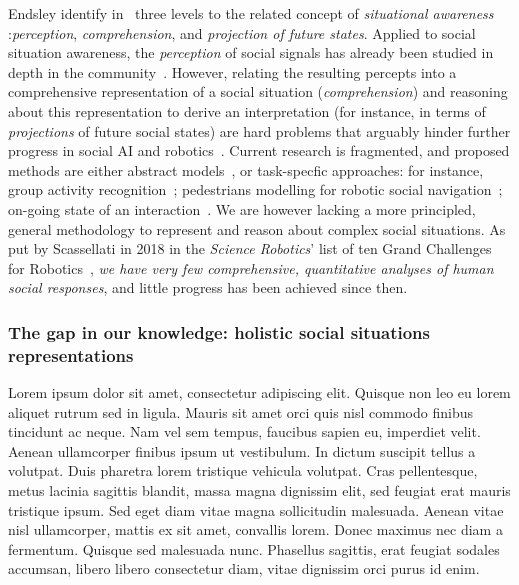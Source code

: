 Endsley identify in~\cite{endsley1995theory} three levels to the related concept
of \textit{situational awareness} :\emph{perception}, \emph{comprehension}, and
\emph{projection of future states}. Applied to social situation awareness,
the \emph{perception} of social signals has already been studied in depth in the
community~\cite{pantic2011social,vinciarelli2009social}.  However, relating the
resulting percepts into a comprehensive representation of a social situation
(\emph{comprehension}) and reasoning about this representation to derive an
interpretation (for instance, in terms of \emph{projections} of future social
states) are hard problems that arguably hinder further progress in social AI and
robotics~\cite{yang2018grand}. Current research is fragmented, and proposed
methods are either abstract models~\cite{gordon2016commonsense}, or task-specfic
approaches: for instance, group activity
recognition~\cite{shu2017cern,wu2019learning}; pedestrians modelling for robotic
social navigation~\cite{alahi2016social}; on-going state of an
interaction~\cite{garcía2020explainable}. We are however lacking a more
principled, general methodology to represent and reason about complex social
situations. As put by Scassellati in 2018 in the \emph{Science Robotics}' list of
ten Grand Challenges for Robotics~\cite{yang2018grand}, \emph{we have very few
comprehensive, quantitative analyses of human social responses}, and little
progress has been achieved since then.


\subsubsection{The gap in our knowledge: holistic social situations
representations}

\begin{rewrite}
Lorem ipsum dolor sit amet, consectetur adipiscing elit. Quisque non leo eu
lorem aliquet rutrum sed in ligula. Mauris sit amet orci quis nisl commodo
finibus tincidunt ac neque. Nam vel sem tempus, faucibus sapien eu,
imperdiet velit. Aenean ullamcorper finibus ipsum ut vestibulum. In dictum
suscipit tellus a volutpat. Duis pharetra lorem tristique vehicula volutpat.
Cras pellentesque, metus lacinia sagittis blandit, massa magna dignissim
elit, sed feugiat erat mauris tristique ipsum. Sed eget diam vitae magna
sollicitudin malesuada. Aenean vitae nisl ullamcorper, mattis ex sit amet,
convallis lorem. Donec maximus nec diam a fermentum. Quisque sed malesuada
nunc. Phasellus sagittis, erat feugiat sodales accumsan, libero libero
consectetur diam, vitae dignissim orci purus id enim.
\end{rewrite}



